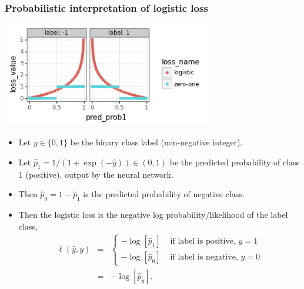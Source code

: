 \documentclass{beamer}
\begin{document}
\begin{frame}
  \frametitle{Probabilistic interpretation of logistic loss}
  \includegraphics[width=0.7\textwidth]{2022-02-15-simplex-binary-loss-prob.png}

  \begin{itemize}
  \item Let $y\in\{0,1\}$ be the binary class label (non-negative integer).
  \item Let $\hat p_1=1/(1+\exp(-\hat y))\in (0,1)$ be the predicted probability
    of class 1 (positive), output by the neural network.
  \item Then $\hat p_0 = 1-\hat p_1$ is the predicted probability of
    negative class.
  \item Then the logistic loss is the negative log
    probability/likelihood of the label class,
    \begin{eqnarray*}
      \ell(\hat y, y) 
        &=& \begin{cases}
              -\log[\hat p_1] & \text{ if label is positive, } y=1 \\
              -\log[\hat p_0] & \text{ if label is negative, } y=0
            \end{cases}\\
        &=& -\log[\hat p_y].
    \end{eqnarray*}
  \end{itemize}

\end{frame}
\end{document}
